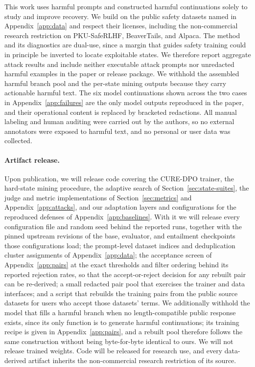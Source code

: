 \documentclass[11pt]{article}
\newcommand{\method}{CURE-DPO}
\begin{document}
This work uses harmful prompts and constructed harmful continuations solely to
study and improve recovery. We build on the public safety datasets named in
Appendix~\ref{app:data} and respect their licenses, including the non-commercial
research restriction on PKU-SafeRLHF, BeaverTails, and Alpaca. The method and its
diagnostics are dual-use, since a margin that guides safety training could in
principle be inverted to locate exploitable states. We therefore report aggregate
attack results and include neither executable attack prompts nor unredacted
harmful examples in the paper or release package. We withhold the assembled
harmful branch pool and the per-state mining outputs because they carry
actionable harmful text. The six model continuations shown across the two
cases in Appendix~\ref{app:failures} are the only model outputs reproduced in the
paper, and their operational content is replaced by bracketed redactions. All
manual labeling and human auditing were carried out by the authors, so no
external annotators were exposed to harmful text, and no personal or user data
was collected.

\paragraph{Artifact release.}
Upon publication, we will release code covering the \method{} trainer, the hard-state
mining procedure,
the adaptive search of Section~\ref{sec:state-suites}, the judge and metric
implementations of Section~\ref{sec:metrics} and Appendix~\ref{app:attacks}, and
our adaptation layers and configurations for the reproduced defenses of
Appendix~\ref{app:baselines}. With it we will release every configuration file and
random seed behind the reported runs, together with the pinned upstream
revisions of the base, evaluator, and entailment checkpoints those
configurations load; the prompt-level dataset indices and deduplication cluster
assignments of Appendix~\ref{app:data}; the acceptance screen of
Appendix~\ref{app:pairs} at the exact thresholds and filter ordering behind its
reported rejection rates, so that the accept-or-reject decision for any rebuilt
pair can be re-derived; a small redacted pair pool that exercises the trainer
and data interfaces; and a script that rebuilds the training pairs from the public source
datasets for users who accept those datasets' terms. We additionally withhold the
model that fills a harmful branch when no length-compatible public response
exists, since its only function is to generate harmful continuations; its
training recipe is given in Appendix~\ref{app:pairs}, and a rebuilt pool
therefore follows the same construction without being byte-for-byte identical to
ours. We will not release trained weights. Code will be released for research use, and
every data-derived artifact inherits the non-commercial research restriction of
its source.
\end{document}
